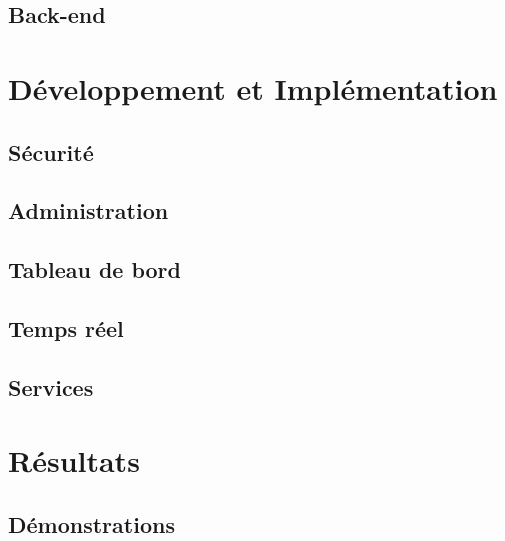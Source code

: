 \documentclass[12pt]{article}
\begin{document}
\subsection{Back-end}



\newpage

\section{Développement et Implémentation}

\subsection{Sécurité}

\subsection{Administration}

\subsection{Tableau de bord}

\subsection{Temps réel}

\subsection{Services}



\newpage

\section{Résultats}

\subsection{Démonstrations}
\end{document}
